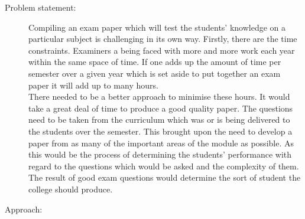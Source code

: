 \begin{description}
  \item[Problem statement:]

  \begin{comment}  
What problem are you trying to solve? What is the
scope of your work (a generalised approach, or for a specific situation)? Be careful not to use too
much jargon. In some cases it is appropriate to put the problem statement before the motivation,
but usually this only works if most readers already understand why the problem is important.
\end{comment}

Compiling an exam paper which will test the students' knowledge on a particular subject is challenging in its own way. Firstly, there are the time constraints. Examiners a being faced with more and more work each year within the same space of time. If one adds up the amount of time per semester over a given year which is set aside to put together an exam paper it will add up to many hours. \\There needed to be a better approach to minimise these hours. It would take a great deal of time to produce a good quality paper. The questions need to be taken from the curriculum which was or is being delivered to the students over the semester. This brought upon the need to develop a paper from as many of the important areas of the module as possible. As this would be the process of determining the students' performance with regard to the questions which would be asked and the complexity of them. The result of good exam questions would determine the sort of student the college should produce.

  \item[Approach:]
  
    \begin{comment}
How did you go about solving or making progress on the problem? Did you use simulation,
analytic models, prototype construction, or analysis of field data for an actual product? What was
the extent of your work (did you look at one application program or a hundred programs in twenty
different programming languages?) What important variables did you control, ignore, or measure?
\end{comment}


\end{description}

